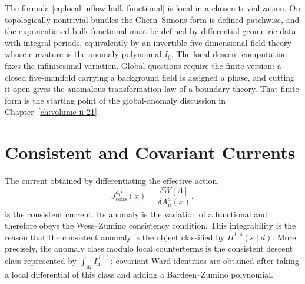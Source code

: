 The formula \eqref{eq:local-inflow-bulk-functional} is local in a chosen
trivialization.  On topologically nontrivial bundles the Chern--Simons form is
defined patchwise, and the exponentiated bulk functional must be defined by
differential-geometric data with integral periods, equivalently by an
invertible five-dimensional field theory whose curvature is the anomaly
polynomial \(I_6\).  The local descent computation fixes the infinitesimal
variation.  Global questions require the finite version: a closed
five-manifold carrying a background field is assigned a phase, and cutting it
open gives the anomalous transformation law of a boundary theory.  That finite
form is the starting point of the global-anomaly discussion in
Chapter~\ref{ch:volume-ii-21}.

\section{Consistent and Covariant Currents}

The current obtained by differentiating the effective action,
\[
  J_{\mathrm{cons}}^{a\mu}(x)
  =
  \frac{\delta W[A]}{\delta A^a_\mu(x)},
\]
is the consistent current.  Its anomaly is the variation of a functional and
therefore obeys the Wess--Zumino consistency condition.  This integrability is
the reason that the consistent anomaly is the object classified by
\(H^{1,4}(s\mid d)\).  More precisely, the anomaly class modulo local
counterterms is the consistent descent class represented by
\(\int_M I_4^{(1)}\); covariant Ward identities are obtained after taking a
local differential of this class and adding a Bardeen--Zumino polynomial.

